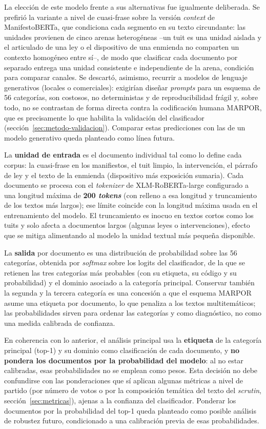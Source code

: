 La elección de este modelo frente a sus alternativas fue igualmente deliberada.
Se prefirió la variante a nivel de cuasi-frase sobre la versión \emph{context} de
ManifestoBERTa, que condiciona cada segmento en su texto circundante: las unidades
provienen de cinco arenas heterogéneas --un tuit es una unidad aislada y el
articulado de una ley o el dispositivo de una enmienda no comparten un contexto
homogéneo entre sí--, de modo que clasificar cada documento por separado entrega
una unidad consistente e independiente de la arena, condición para comparar
canales. Se descartó, asimismo, recurrir a modelos de lenguaje generativos
(locales o comerciales): exigirían diseñar \emph{prompts} para un esquema de 56
categorías, son costosos, no deterministas y de reproducibilidad frágil y, sobre
todo, no se contrastan de forma directa contra la codificación humana MARPOR, que
es precisamente lo que habilita la validación del clasificador
(sección~\ref{sec:metodo-validacion}). Comparar estas predicciones con las de un
modelo generativo queda planteado como línea futura.

La \textbf{unidad de entrada} es el documento individual tal como lo define cada
corpus: la cuasi-frase en los manifiestos, el tuit limpio, la intervención, el
párrafo de ley y el texto de la enmienda (dispositivo más exposición sumaria).
Cada documento se procesa con el \emph{tokenizer} de XLM-RoBERTa-large
configurado a una longitud máxima de \textbf{200
\emph{tokens}} (con relleno a esa longitud y truncamiento de los textos más
largos); ese límite coincide con la longitud máxima usada en el entrenamiento del
modelo. El truncamiento es inocuo en textos cortos como los tuits y solo afecta a
documentos largos (algunas leyes o intervenciones), efecto que se mitiga
alimentando al modelo la unidad textual más pequeña disponible.

La \textbf{salida} por documento es una distribución de probabilidad sobre las 56
categorías, obtenida por \emph{softmax} sobre los logits del clasificador, de la
que se retienen las tres categorías más probables (con su etiqueta, su código y
su probabilidad) y el dominio asociado a la categoría principal. Conservar
también la segunda y la tercera categoría es una concesión a que el esquema
MARPOR asume una etiqueta por documento, lo que penaliza a los textos
multitemáticos; las probabilidades sirven para ordenar las categorías y como
diagnóstico, no como una medida calibrada de confianza.

En coherencia con lo anterior, el análisis principal usa la \textbf{etiqueta} de
la categoría principal (top-1) y su dominio como clasificación de cada documento,
y \textbf{no pondera los documentos por la probabilidad del modelo}: al no estar
calibradas, esas probabilidades no se emplean como pesos. Esta decisión no debe
confundirse con las ponderaciones que sí aplican algunas métricas a nivel de
partido (por número de votos o por la composición temática del texto del
\emph{scrutin}, sección~\ref{sec:metricas}), ajenas a la confianza del
clasificador. Ponderar los documentos por la probabilidad del top-1 queda
planteado como posible análisis de robustez futuro, condicionado a una calibración
previa de esas probabilidades.

